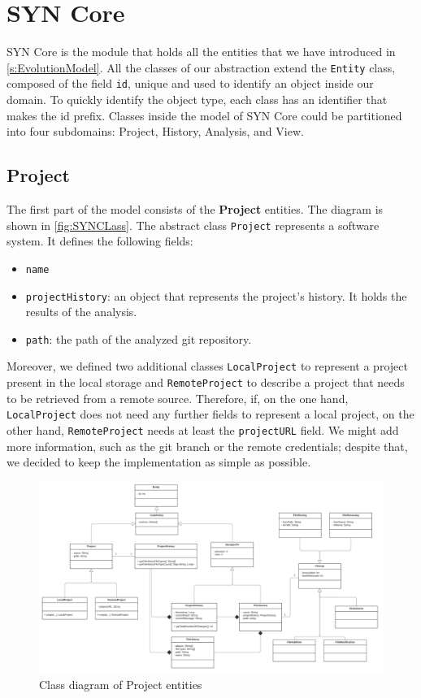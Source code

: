 \section{SYN Core}
SYN Core is the module that holds all the entities that we have introduced in \autoref{s:EvolutionModel}. 
All the classes of our abstraction extend the \texttt{Entity} class, composed of the field \texttt{id}, unique and used to identify an object inside our domain. 
To quickly identify the object type, each class has an identifier that makes the id prefix. 
Classes inside the model of SYN Core could be partitioned into four subdomains: Project, History, Analysis, and View. 

\subsection*{Project}
The first part of the model consists of the \textbf{Project} entities. 
The diagram is shown in \autoref{fig:SYNCLass}. The abstract class \texttt{Project} represents a software system. It defines the following fields:
\begin{itemize}
    \item \texttt{name}
    \item \texttt{projectHistory}: an object that represents the project's history. It holds the results of the analysis. 
    \item \texttt{path}: the path of the analyzed git repository. 
\end{itemize}

Moreover, we defined two additional classes \texttt{LocalProject} to represent a project present in the local storage and \texttt{RemoteProject} to describe a project that needs to be retrieved from a remote source. 
Therefore, if, on the one hand, \texttt{LocalProject} does not need any further fields to represent a local project, on the other hand, \texttt{RemoteProject} needs at least the \texttt{projectURL} field. We might add more information, such as the git branch or the remote credentials; despite that, we decided to keep the implementation as simple as possible. 


\begin{figure}
    \center
    \includegraphics[width=\textwidth]{SYNClass.png}
    \caption{Class diagram of Project entities}
    \label{fig:SYNCLass}
\end{figure}

